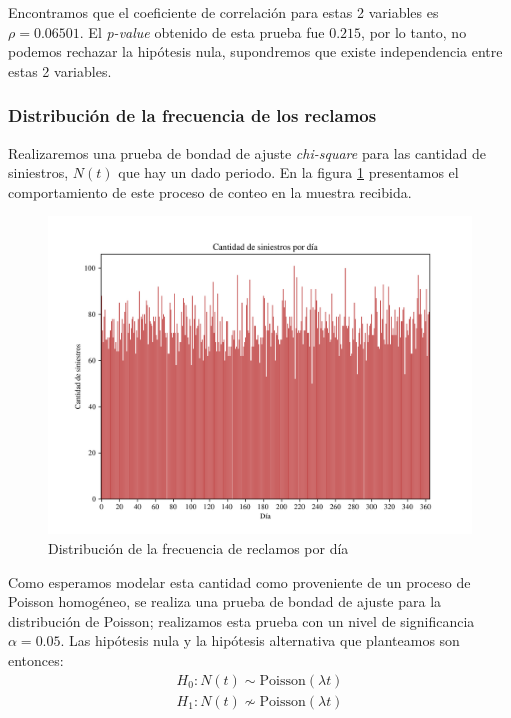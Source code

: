 \documentclass[journal]{IEEEtran}
\begin{document}
                Encontramos que el coeficiente de correlación para estas 2 variables es $\rho = 0.06501$. El \textit{p-value} obtenido de esta prueba fue $0.215$, por lo tanto, no podemos rechazar la hipótesis nula, supondremos que existe independencia entre estas 2 variables.
            
            \subsubsection{Distribución de la frecuencia de los reclamos}
            
                Realizaremos una prueba de bondad de ajuste \textit{chi-square} para las cantidad de siniestros, $N(t)$ que hay un dado periodo. En la figura \ref{img:claims_per_day} presentamos el comportamiento de este proceso de conteo en la muestra recibida. 
            
                \begin{figure}[!htbp]
                    \centering
                    \includegraphics[scale=0.45]{img/claims_per_day.png}
                    \caption{Distribución de la frecuencia de reclamos por día}
                    \label{img:claims_per_day}
                \end{figure}

                Como esperamos modelar esta cantidad como proveniente de un proceso de Poisson homogéneo, se realiza una prueba de bondad de ajuste para la distribución de Poisson; realizamos esta prueba con un nivel de significancia $\alpha = 0.05$. Las hipótesis nula y la hipótesis alternativa que planteamos son entonces:
                \begin{gather*}
                    H_0: N(t) \sim \text{Poisson}(\lambda t) \\
                    H_1 : N(t) \not \sim \text{Poisson}(\lambda t)
                \end{gather*}
\end{document}
